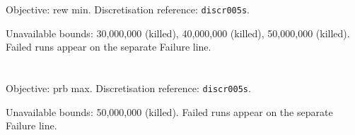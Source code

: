 \documentclass[a4paper,10pt]{article}
\begin{document}
\noindent\begin{minipage}{\linewidth}
\section*{\small\texttt{}}
Objective: rew min. Discretisation reference: \texttt{discr005s}.

\begin{minipage}[t]{0.48\linewidth}\centering

\end{minipage}
\hfill
\begin{minipage}[t]{0.48\linewidth}\centering

\end{minipage}
\par\medskip
Unavailable bounds: 30,000,000 (killed), 40,000,000 (killed), 50,000,000 (killed). Failed runs appear on the separate Failure line.

\end{minipage}\par\bigskip
\noindent\begin{minipage}{\linewidth}
\section*{\small\texttt{}}
Objective: prb max. Discretisation reference: \texttt{discr005s}.

\begin{minipage}[t]{0.48\linewidth}\centering

\end{minipage}
\hfill
\begin{minipage}[t]{0.48\linewidth}\centering

\end{minipage}
\par\medskip
Unavailable bounds: 50,000,000 (killed). Failed runs appear on the separate Failure line.

\end{minipage}\par\bigskip
\clearpage
\end{document}
